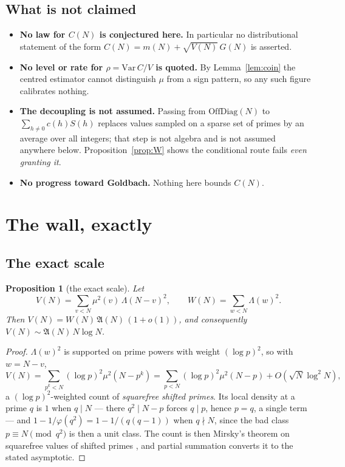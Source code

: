 \documentclass[11pt,a4paper]{article}
\theoremstyle{plain}
\newtheorem{proposition}[theorem]{Proposition}
\theoremstyle{definition}
\theoremstyle{remark}
\newcommand{\AAA}{\mathfrak{A}}
\begin{document}
\subsection{What is not claimed}\label{sec:notclaimed}

\begin{itemize}
\item \textbf{No law for $C(N)$ is conjectured here.} In particular no
distributional statement of the form
$C(N)=m(N)+\sqrt{V(N)}\,G(N)$ is asserted.

\item \textbf{No level or rate for $\rho=\mathrm{Var}\,C/V$ is
quoted.} By Lemma~\ref{lem:coin} the centred estimator cannot
distinguish $\mu$ from a sign pattern, so any such figure calibrates
nothing.

\item \textbf{The decoupling is not assumed.} Passing from
$\mathrm{OffDiag}(N)$ to $\sum_{h\ne0}c(h)S(h)$ replaces values
sampled on a sparse set of primes by an average over all integers;
that step is not algebra and is not assumed anywhere below.
Proposition~\ref{prop:W} shows the conditional route fails
\emph{even granting it}.

\item \textbf{No progress toward Goldbach.} Nothing here bounds
$C(N)$.
\end{itemize}

\section{The wall, exactly}\label{sec:exact}

\subsection{The exact scale}

\begin{proposition}[the exact scale]\label{prop:V}
Let
\[
  V(N)=\sum_{v<N}\mu^2(v)\,\Lambda(N-v)^2,
  \qquad
  W(N)=\sum_{w<N}\Lambda(w)^2 .
\]
Then $V(N)=W(N)\,\AAA(N)\,(1+o(1))$, and consequently
$V(N)\sim\AAA(N)\,N\log N$.
\end{proposition}

\begin{proof}
$\Lambda(w)^2$ is supported on prime powers with weight $(\log p)^2$,
so with $w=N-v$,
\[
  V(N)=\sum_{p^k<N}(\log p)^2\mu^2(N-p^k)
      =\sum_{p<N}(\log p)^2\mu^2(N-p)+O(\sqrt N\log^2N),
\]
a $(\log p)^2$-weighted count of \emph{squarefree shifted primes}. Its
local density at a prime $q$ is $1$ when $q\mid N$ --- there
$q^2\mid N-p$ forces $q\mid p$, hence $p=q$, a single term --- and
$1-1/\varphi(q^2)=1-1/(q(q-1))$ when $q\nmid N$, since the bad class
$p\equiv N\pmod{q^2}$ is then a unit class. The count is then Mirsky's
theorem on squarefree values of shifted primes \cite{Mir49}, and
partial summation converts it to the stated asymptotic.
\end{proof}
\end{document}
